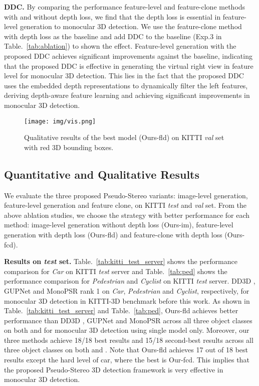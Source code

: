 \documentclass[10pt,twocolumn,letterpaper]{article}
\begin{document}
\noindent\textbf{DDC.} By comparing the performance feature-level and feature-clone methods with and without depth loss, we find that the depth loss is essential in feature-level generation to monocular 3D detection. We use the feature-clone method with depth loss as the baseline and add DDC to the baseline (Exp.3 in Table.~\ref{tab:ablation}) to shown the effect. Feature-level generation with the proposed DDC achieves significant improvements against the baseline, indicating that the proposed DDC is effective in generating the virtual right view in feature level for monocular 3D detection. This lies in the fact that the proposed DDC uses the embedded depth representations to dynamically filter the left features, deriving depth-aware feature learning and achieving significant improvements in monocular 3D detection.



\begin{figure*}[t!]
  \centering
 \texttt{[image: img/vis.png]}
 \vspace{-4mm}
  \caption{Qualitative results of the best model (Ours-fld) on KITTI \emph{val} set with red 3D bounding boxes.} 
 \label{fig:result}
 \vspace{-2mm}
\end{figure*} 

\subsection{Quantitative and Qualitative Results}
We evaluate the three proposed Pseudo-Stereo variants: image-level generation, feature-level generation and feature clone, on KITTI \emph{test} and \emph{val} set. 
From the above ablation studies, we choose the strategy with better performance for each method: image-level generation without depth loss (Ours-im), feature-level generation with depth loss (Ours-fld) and feature-clone with depth loss (Ours-fcd).

\noindent\textbf{Results on \emph{test} set.} Table.~\ref{tab:kitti_test_server} shows the performance comparison for \emph{Car} on KITTI \emph{test} server and Table.~\ref{tab:ped} shows the performance comparison for \emph{Pedestrian} and \emph{Cyclist} on KITTI \emph{test} server. DD3D \cite{park2021pseudo}, GUPNet \cite{lu2021geometry} and MonoPSR \cite{ku2019monocular} rank 1 on \emph{Car}, \emph{Pedestrian} and \emph{Cyclist}, respectively, for monocular 3D detection in KITTI-3D benchmark before this work. As shown in Table.~\ref{tab:kitti_test_server} and Table.~\ref{tab:ped}, Ours-fld achieves better performance than DD3D \cite{park2021pseudo}, GUPNet \cite{lu2021geometry} and MonoPSR \cite{ku2019monocular} across all three object classes on both  and  for monocular 3D detection using single model only. Moreover, our three methods achieve 18/18 best results and 15/18 second-best results across all three object classes on both  and . Note that Ours-fld achieves 17 out of 18 best results except the hard level of car, where the best is Our-fcd. This implies that the proposed Pseudo-Stereo 3D detection framework is very effective in monocular 3D detection. 
\end{document}
